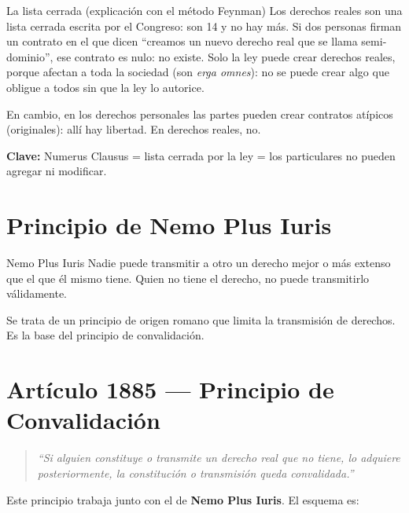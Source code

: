 \documentclass[12pt,oneside]{book}
\begin{document}
\begin{example}{La lista cerrada (explicaci\'on con el m\'etodo Feynman)}
Los derechos reales son una lista cerrada escrita por el Congreso: son 14 y no hay m\'as. Si dos personas firman un contrato en el que dicen ``creamos un nuevo derecho real que se llama semi-dominio'', ese contrato es nulo: no existe. Solo la ley puede crear derechos reales, porque afectan a toda la sociedad (son \textit{erga omnes}): no se puede crear algo que obligue a todos sin que la ley lo autorice.

En cambio, en los derechos personales las partes pueden crear contratos at\'ipicos (originales): all\'i hay libertad. En derechos reales, no.

\textbf{Clave:} Numerus Clausus = lista cerrada por la ley = los particulares no pueden agregar ni modificar.
\end{example}

\section{Principio de Nemo Plus Iuris}

\begin{definition}{Nemo Plus Iuris}
Nadie puede transmitir a otro un derecho mejor o m\'as extenso que el que \'el mismo tiene. Quien no tiene el derecho, no puede transmitirlo v\'alidamente.
\end{definition}

Se trata de un principio de origen romano que limita la transmisi\'on de derechos. Es la base del principio de convalidaci\'on.

\section{Art\'iculo 1885 --- Principio de Convalidaci\'on}

\begin{quote}
\textit{``Si alguien constituye o transmite un derecho real que no tiene, lo adquiere posteriormente, la constituci\'on o transmisi\'on queda convalidada.''}
\end{quote}


Este principio trabaja junto con el de \textbf{Nemo Plus Iuris}. El esquema es:
\end{document}
